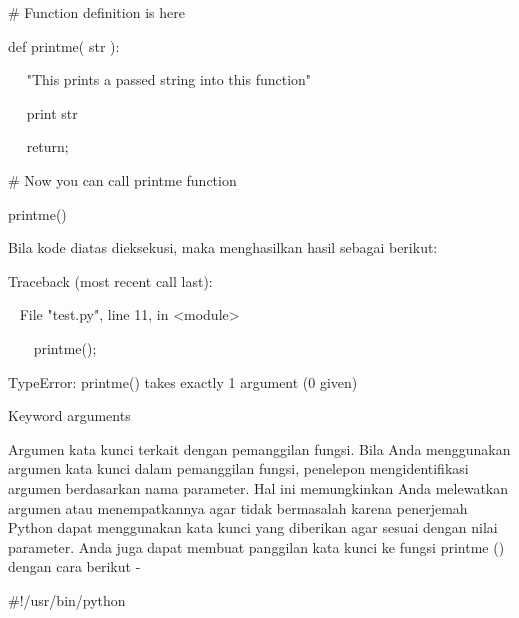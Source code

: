 \vspace{12pt}
\noindent 
 \hspace*{0.5in}  $  \#  $ Function definition is here \par
\noindent 
 \hspace*{0.5in} def printme( str ): \par
\noindent 
~~  \hspace*{0.5in}  \hspace*{0.5in} "This prints a passed string into this function" \par
\noindent 
~~  \hspace*{0.5in} print str \par
\noindent 
~~  \hspace*{0.5in} return; \par
\vspace{12pt}
\noindent 
 \hspace*{0.5in}  $  \#  $ Now you can call printme function \par
\noindent 
 \hspace*{0.5in} printme() \par
\noindent 
Bila kode diatas dieksekusi, maka menghasilkan hasil sebagai berikut: \par
\noindent 
 \hspace*{0.5in} Traceback (most recent call last): \par
\noindent 
 \hspace*{0.5in} ~ File "test.py", line 11, in <module> \par
\noindent 
 \hspace*{0.5in} ~~~ printme(); \par
\noindent 
 \hspace*{0.5in} TypeError: printme() takes exactly 1 argument (0 given) \par
\vspace{12pt}
\noindent 
Keyword arguments \par
\noindent 
Argumen kata kunci terkait dengan pemanggilan fungsi. Bila Anda menggunakan argumen kata kunci dalam pemanggilan fungsi, penelepon mengidentifikasi argumen berdasarkan nama parameter. Hal ini memungkinkan Anda melewatkan argumen atau menempatkannya agar tidak bermasalah karena penerjemah Python dapat menggunakan kata kunci yang diberikan agar sesuai dengan nilai parameter. Anda juga dapat membuat panggilan kata kunci ke fungsi printme () dengan cara berikut - \par
\noindent 
 \hspace*{0.5in}  $  \#  $!/usr/bin/python \par
